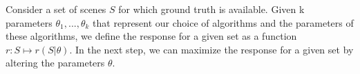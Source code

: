 Consider a set of scenes $S$ for which ground truth is available. Given k
parameters $\theta_1, ..., \theta_k$ that represent our choice of algorithms
and the parameters of these algorithms, we define the response for a given set
as a function $r: S \mapsto r (S|\theta)$. In the next step, we can maximize
the response for a given set by altering the parameters $\theta$.





